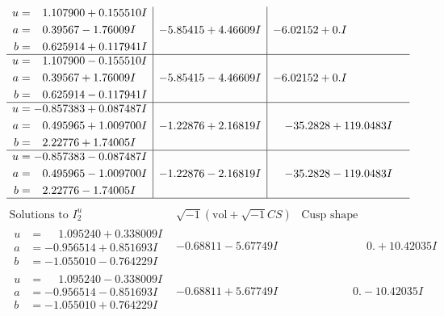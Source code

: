 \documentclass[1p]{elsarticle_modified}
\theoremstyle{definition}
\newcommand{\I}{\sqrt{-1}}
\begin{document}
$$\begin{array}{c|c|c}
\begin{aligned}
u &= \phantom{-}1.107900 + 0.155510 I \\
a &= \phantom{-}0.39567 - 1.76009 I \\
b &= \phantom{-}0.625914 + 0.117941 I\end{aligned}
 & -5.85415 + 4.46609 I & -6.02152 + 0. I\phantom{ +0.000000I} \\ \hline\begin{aligned}
u &= \phantom{-}1.107900 - 0.155510 I \\
a &= \phantom{-}0.39567 + 1.76009 I \\
b &= \phantom{-}0.625914 - 0.117941 I\end{aligned}
 & -5.85415 - 4.46609 I & -6.02152 + 0. I\phantom{ +0.000000I} \\ \hline\begin{aligned}
u &= -0.857383 + 0.087487 I \\
a &= \phantom{-}0.495965 + 1.009700 I \\
b &= \phantom{-}2.22776 + 1.74005 I\end{aligned}
 & -1.22876 + 2.16819 I & -35.2828 + 119.0483 I \\ \hline\begin{aligned}
u &= -0.857383 - 0.087487 I \\
a &= \phantom{-}0.495965 - 1.009700 I \\
b &= \phantom{-}2.22776 - 1.74005 I\end{aligned}
 & -1.22876 - 2.16819 I & -35.2828 - 119.0483 I\\
 \hline 
 \end{array}$$\newpage$$\begin{array}{c|c|c}  
\text{Solutions to }I^u_{2}& \I (\text{vol} + \sqrt{-1}CS) & \text{Cusp shape}\\
 \hline 
\begin{aligned}
u &= \phantom{-}1.095240 + 0.338009 I \\
a &= -0.956514 + 0.851693 I \\
b &= -1.055010 - 0.764229 I\end{aligned}
 & -0.68811 - 5.67749 I & \phantom{-0.000000 -}0. + 10.42035 I \\ \hline\begin{aligned}
u &= \phantom{-}1.095240 - 0.338009 I \\
a &= -0.956514 - 0.851693 I \\
b &= -1.055010 + 0.764229 I\end{aligned}
 & -0.68811 + 5.67749 I & \phantom{-0.000000 } 0. - 10.42035 I \\ \hline\begin{aligned}

\end{aligned}
\end{array}$$
\end{document}
